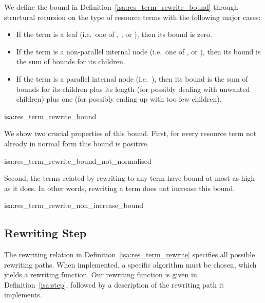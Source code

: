 \documentclass[class=smolathesis,crop=false]{standalone}
\begin{document}
We define the bound in Definition~\ref{isa:res_term_rewrite_bound} through structural recursion on the type of resource terms with the following major cases:
\begin{itemize}
  \item If the term is a leaf (i.e.\ one of , ,  or ), then its bound is zero.
  \item If the term is a non-parallel internal node (i.e.\ one of ,  or ), then its bound is the sum of bounds for its children.
  \item If the term is a parallel internal node (i.e.\ ), then its bound is the sum of bounds for its children plus its length (for possibly dealing with unwanted children) plus one (for possibly ending up with too few children).
\end{itemize}

\cbstart
\begin{isadef}{isa:res_term_rewrite_bound}
  
\end{isadef}

We show two crucial properties of this bound.
First, for every resource term not already in normal form this bound is positive.
\begin{isalemma}{isa:res_term_rewrite_bound_not_normalised}
  
\end{isalemma}

Second, the terms related by rewriting to any term have bound at most as high as it does.
In other words, rewriting a term does not increase this bound.
\begin{isalemma}{isa:res_term_rewrite_non_increase_bound}
  
\end{isalemma}
\cbend

\subsection{Rewriting Step}
\label{sec:res/rewr/step}

The rewriting relation in Definition~\ref{isa:res_term_rewrite} specifies all possible rewriting paths.
When implemented, a specific algorithm must be chosen, which yields a rewriting function.
Our rewriting function is given in Definition~\ref{isa:step}, followed by a description of the rewriting path it implements.
\end{document}
